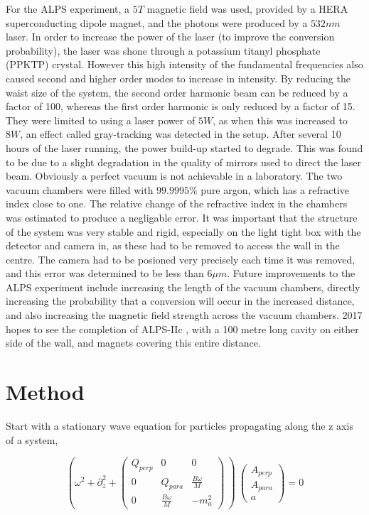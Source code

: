 \documentclass[12pt]{article}
\begin{document}
For the ALPS experiment, a $5T$ magnetic field was used, provided by a HERA superconducting dipole magnet, and the photons were produced by a $532nm$ laser. In order to increase the power of the laser (to improve the conversion probability), the laser was shone through a potassium titanyl phosphate (PPKTP) crystal. However this high intensity of the fundamental frequencies also caused second and higher order modes to increase in intensity. By reducing the waist size of the system, the second order harmonic beam can be reduced by a factor of 100, whereas the first order harmonic is only reduced by a factor of 15. They were limited to using a laser power of $5W$, as when this was increased to $8W$, an effect called gray-tracking was detected in the setup.
After several 10 hours of the laser running, the power build-up started to degrade. This was found to be due to a slight degradation in the quality of mirrors used to direct the laser beam. 
Obviously a perfect vacuum is not achievable in a laboratory. The two vacuum chambers were filled with $99.9995\%$ pure argon, which has a refractive index close to one. The relative change of the refractive index in the chambers was estimated to produce a negligable error.
It was important that the structure of the system was very stable and rigid, especially on the light tight box with the detector and camera in, as these had to be removed to access the wall in the centre. The camera had to be posioned very precisely each time it was removed, and this error was determined to be less than $6\mu m$. 
Future improvements to the ALPS experiment include increasing the length of the vacuum chambers, directly increasing the probability that a conversion will occur in the increased distance, and also increasing the magnetic field strength across the vacuum chambers. 2017 hopes to see the completion of ALPS-IIc \autocite{https://alps.desy.de/e141064, 11/05/2014}, with a 100 metre long cavity on either side of the wall, and magnets covering this entire distance.



\section{Method}
\label{sec:method}

Start with a stationary wave equation for particles propagating along the z axis of a system, 

\begin{equation}
\left(\omega^2+\partial_z^2+\left( \begin{array}{ccc}
Q_{perp} & 0 & 0 \\
0 & Q_{para} & {\frac{B\omega}{M}} \\
0 & {\frac{B\omega}{M}} & -m_a^2 \end{array} \right)\ \right)\
\left( \begin{array}{c} 
A_{perp} \\ 
A_{para} \\
a \end{array} \right) = 0 
\end{equation}
\end{document}
